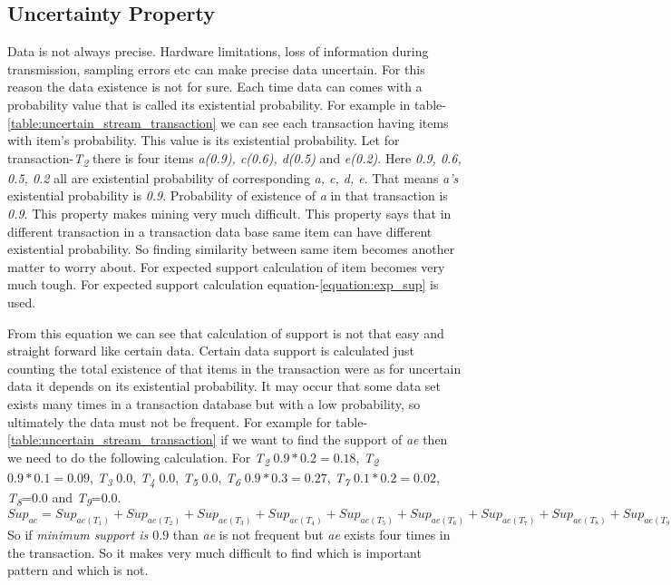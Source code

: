 	\subsection{Uncertainty Property}
	Data is not always precise. Hardware limitations, loss of information during transmission, sampling errors etc can make precise data uncertain. For this reason the data existence is not for sure. Each time data can comes with a probability value that is called its existential probability. For example in table-\ref{table:uncertain_stream_transaction}  we can see each transaction having items with item's probability. This value is its existential probability. Let for transaction-\emph{T\textsubscript{2}} there is four items \emph{a(0.9), c(0.6), d(0.5)} and \emph{e(0.2)}. Here \emph{0.9, 0.6, 0.5, 0.2} all are existential probability of corresponding \emph{a, c, d, e}. That means \emph{a's} existential probability is \emph{0.9}. Probability of existence of \emph{a} in that transaction is \emph{0.9}. This property makes mining very much difficult. This property says that in different transaction in a transaction data base same item can have different existential probability. So finding similarity between same item becomes another matter to worry about. For expected support calculation of item becomes very much tough. For expected support calculation equation-\ref{equation:exp_sup} is used.
	
	From this equation we can see that calculation of support is not that easy and straight forward like certain data. Certain data support is calculated just counting the total existence of that items in the transaction were as for uncertain data it depends on its existential probability. It may occur that some data set exists many times in a transaction database but with a low probability, so ultimately the data must not be frequent. For example for table-\ref{table:uncertain_stream_transaction} if we want to find the support of \emph{ae} then we need to do the following calculation. For \emph{T\textsubscript{2}} $0.9*0.2=0.18$, \emph{T\textsubscript{2}} $0.9*0.1=0.09$, \emph{T\textsubscript{3}} $0.0$, \emph{T\textsubscript{4}} $0.0$, \emph{T\textsubscript{5}} $0.0$, \emph{T\textsubscript{6}} $0.9*0.3=0.27$, \emph{T\textsubscript{7}} $0.1*0.2=0.02$, \emph{T\textsubscript{8}}=$0.0$ and \emph{T\textsubscript{9}}=$0.0$.$Sup_{ae} =Sup_{ae(T_1)}+Sup_{ae(T_2)}+Sup_{ae(T_3)}+Sup_{ae(T_4)}+Sup_{ae(T_5)}+Sup_{ae(T_6)}+Sup_{ae(T_7)}+Sup_{ae(T_8)}+Sup_{ae(T_9)}=0.18+0.09+0.0+0.0+0.0+0.27+0.0+0.02+0.0+0.0=0.54$ So if \emph{minimum support is $0.9$} than \emph{ae} is not frequent but \emph{ae} exists four times in the transaction. So it makes very much difficult to find which is important pattern and which is not.
	
